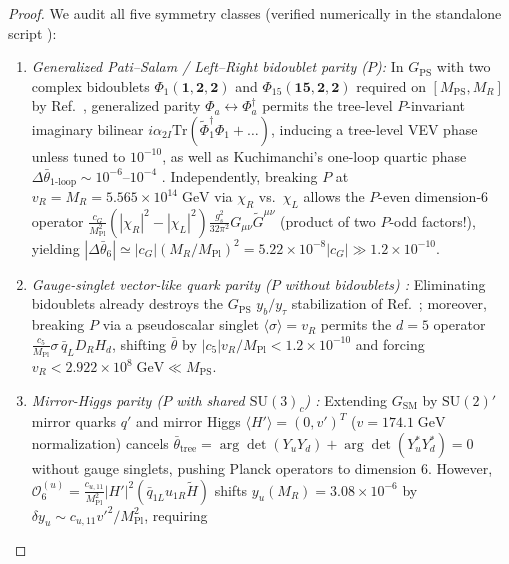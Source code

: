 \documentclass[11pt,a4paper]{article}
\begin{document}
\begin{proof}
We audit all five symmetry classes (verified numerically in the standalone script ):
\begin{enumerate}[label=(\roman*),leftmargin=1.9em,itemsep=2pt]
\item \emph{Generalized Pati--Salam / Left--Right bidoublet parity ($P$):} In $G_{\mathrm{PS}}$ with two complex bidoublets $\Phi_1(\mathbf{1},\mathbf{2},\mathbf{2})$ and $\Phi_{15}(\mathbf{15},\mathbf{2},\mathbf{2})$ required on $[M_{\mathrm{PS}}, M_R]$ by Ref.~\cite{Olcsak2026Paper25}, generalized parity $\Phi_a \leftrightarrow \Phi_a^\dagger$ permits the tree-level $P$-invariant imaginary bilinear $i\alpha_{2I}\mathrm{Tr}(\tilde{\Phi}_1^\dagger \Phi_1 + \dots)$, inducing a tree-level VEV phase unless tuned to $10^{-10}$, as well as Kuchimanchi's one-loop quartic phase $\Delta\bar{\theta}_{\text{1-loop}} \sim 10^{-6}\text{--}10^{-4}$ \cite{Kuchimanchi1996}. Independently, breaking $P$ at $v_R = M_R = 5.565\times 10^{14}\;\mathrm{GeV}$ via $\chi_R$ vs.\ $\chi_L$ allows the $P$-even dimension-6 operator $\frac{c_G}{M_{\mathrm{Pl}}^2}(|\chi_R|^2 - |\chi_L|^2)\frac{g_s^2}{32\pi^2}G_{\mu\nu}\tilde{G}^{\mu\nu}$ (product of two $P$-odd factors!), yielding $|\Delta\bar{\theta}_6| \simeq |c_G|(M_R/M_{\mathrm{Pl}})^2 = 5.22\times 10^{-8}|c_G| \gg 1.2\times 10^{-10}$.
\item \emph{Gauge-singlet vector-like quark parity ($P$ without bidoublets) \cite{BabuMohapatra1990}:} Eliminating bidoublets already destroys the $G_{\mathrm{PS}}$ $y_b/y_\tau$ stabilization of Ref.~\cite{Olcsak2026Paper25}; moreover, breaking $P$ via a pseudoscalar singlet $\langle\sigma\rangle = v_R$ permits the $d=5$ operator $\frac{c_5}{M_{\mathrm{Pl}}}\sigma\,\bar{q}_L D_R H_d$, shifting $\bar{\theta}$ by $|c_5|v_R/M_{\mathrm{Pl}} < 1.2\times 10^{-10}$ and forcing $v_R < 2.922\times 10^8\;\mathrm{GeV} \ll M_{\mathrm{PS}}$.
\item \emph{Mirror-Higgs parity ($P$ with shared $\mathrm{SU}(3)_c$) \cite{BarrChangSenjanovic1991,HallHarigaya2018}:} Extending $G_{\mathrm{SM}}$ by $\mathrm{SU}(2)'$ mirror quarks $q'$ and mirror Higgs $\langle H'\rangle = (0, v')^T$ ($v = 174.1\;\mathrm{GeV}$ normalization) cancels $\bar{\theta}_{\mathrm{tree}} = \arg\det(Y_u Y_d) + \arg\det(Y_u^* Y_d^*) = 0$ without gauge singlets, pushing Planck operators to dimension 6. However, $\mathcal{O}_6^{(u)} = \frac{c_{u,11}}{M_{\mathrm{Pl}}^2}|H'|^2(\bar{q}_{1L} u_{1R} \tilde{H})$ shifts $y_u(M_R) = 3.08\times 10^{-6}$ by $\delta y_u \sim c_{u,11} v'^2/M_{\mathrm{Pl}}^2$, requiring

\end{enumerate}
\end{proof}
\end{document}
